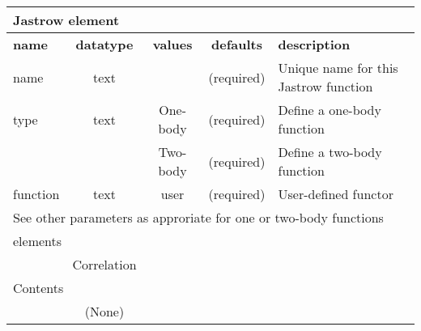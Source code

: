 \begin{table}[h]
\begin{center}
\begin{tabular}{l c c c l }
\hline
\multicolumn{5}{l}{Jastrow element} \\
\hline
\bfseries name & \bfseries datatype & \bfseries values & \bfseries defaults  & \bfseries description \\
\hline
name & text &    & (required) & Unique name for this Jastrow function \\
type & text & One-body & (required) & Define a one-body function \\
     &      & Two-body & (required) & Define a two-body function \\
function & text & user & (required) & User-defined functor \\
\multicolumn{5}{l}{See other parameters as approriate for one or two-body functions} \\
  \hline
\multicolumn{5}{l}{elements}\\ \hline
& Correlation & & & \\ \hline
\multicolumn{5}{l}{Contents}\\ \hline
& (None)  & & &  \\ \hline
\end{tabular}
\end{center}
\end{table}

